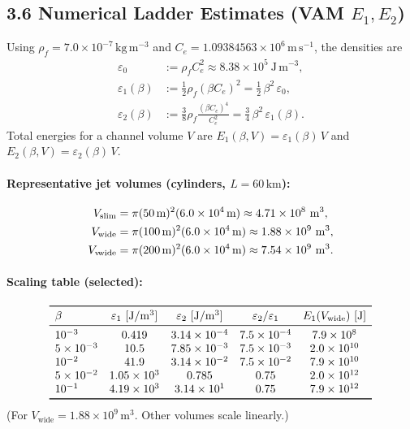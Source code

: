 \documentclass[11pt]{article}
\newcommand{\rhof}{\rho_{\!f}}
\newcommand{\Ce}{C_{e}}
\begin{document}
\subsection*{3.6 Numerical Ladder Estimates (VAM \texorpdfstring{$E_1,E_2$}{E1,E2})}

Using $\rhof = 7.0\times 10^{-7}\,\mathrm{kg\,m^{-3}}$ and $\Ce = 1.09384563\times 10^6\,\mathrm{m\,s^{-1}}$, the densities are
\begin{align}
\varepsilon_0 &:= \rhof \Ce^2 \approx 8.38\times 10^{5}\ \mathrm{J\,m^{-3}},\\
\varepsilon_1(\beta) &:= \tfrac{1}{2}\rhof (\beta\Ce)^2
= \tfrac{1}{2}\,\beta^2\,\varepsilon_0,\\
\varepsilon_2(\beta) &:= \tfrac{3}{8}\rhof \frac{(\beta\Ce)^4}{\Ce^2}
= \tfrac{3}{4}\,\beta^2\,\varepsilon_1(\beta).
\end{align}
Total energies for a channel volume $V$ are $E_1(\beta,V)=\varepsilon_1(\beta)\,V$ and $E_2(\beta,V)=\varepsilon_2(\beta)\,V$.

\paragraph{Representative jet volumes (cylinders, $L=60\,\mathrm{km}$):}
    \[
        \begin{aligned}
        V_{\text{slim}} &= \pi (50\,\mathrm{m})^2 (6.0\times 10^4\,\mathrm{m}) \approx 4.71\times 10^{8}\ \mathrm{m^3},\\
        V_{\text{wide}} &= \pi (100\,\mathrm{m})^2 (6.0\times 10^4\,\mathrm{m}) \approx 1.88\times 10^{9}\ \mathrm{m^3},\\
        V_{\text{v\!wide}} &= \pi (200\,\mathrm{m})^2 (6.0\times 10^4\,\mathrm{m}) \approx 7.54\times 10^{9}\ \mathrm{m^3}.
        \end{aligned}
    \]

\paragraph{Scaling table (selected):}
    \[
        \begin{array}{lcccc}
        \toprule
        \beta & \varepsilon_1\ [\mathrm{J/m^3}] & \varepsilon_2\ [\mathrm{J/m^3}] & \varepsilon_2/\varepsilon_1 & E_1(V_{\text{wide}})\ [\mathrm{J}]\\
        \midrule
        10^{-3} & 0.419 & 3.14\times 10^{-4} & 7.5\times 10^{-4} & 7.9\times 10^{8} \\
        5\times 10^{-3} & 10.5 & 7.85\times 10^{-3} & 7.5\times 10^{-3} & 2.0\times 10^{10} \\
        10^{-2} & 41.9 & 3.14\times 10^{-2} & 7.5\times 10^{-2} & 7.9\times 10^{10} \\
        5\times 10^{-2} & 1.05\times 10^{3} & 0.785 & 0.75 & 2.0\times 10^{12} \\
        10^{-1} & 4.19\times 10^{3} & 3.14\times 10^{1} & 0.75 & 7.9\times 10^{12} \\
        \bottomrule
        \end{array}
    \]
    (For $V_{\text{wide}}=1.88\times 10^9\,\mathrm{m^3}$. Other volumes scale linearly.)
\end{document}
